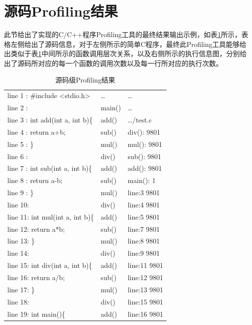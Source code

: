 \section{源码Profiling结果}
此节给出了实现的C/C++程序Profiling工具的最终结果输出示例，如表\ref{tab:13}所示，表格左侧给出了源码信息，对于左侧所示的简单C程序，最终此Profiling工具能够给出类似于表\ref{tab:13}中间所示的函数调用层次关系，以及右侧所示的执行信息图，分别给出了源码所对应的每一个函数的调用次数以及每一行所对应的执行次数。
\begin{table}[ht]
\centering
\caption{源码级Profiling结果}
\label{tab:13}
\begin{tabular}{|l|p{3cm}|l|}
\hline
line 1 : \#include <stdio.h>& \dots& \dots\\
line 2 : &\quad main()& \dots \\
line 3 : int add(int a, int b)\{& \quad \quad add()& \dots/test.c\\
line 4 : \quad return a+b;&\quad \quad sub()& \quad div():  9801\\
line 5 : \}& \quad \quad mul()& \quad mul():  9801\\
line 6 :& \quad \quad div()& \quad sub():  9801\\
line 7 : int sub(int a, int b)\{& \quad \quad add()& \quad add():  9801\\
line 8 : \quad return a-b;& \quad \quad sub()& \quad main():  1\\
line 9 : \}& \quad \quad mul()& \quad \quad line:3		9801\\
line 10:& \quad \quad div()& \quad \quad line:4		9801\\
line 11: int mul(int a, int b)\{& \quad \quad add()& \quad \quad line:5		9801\\
line 12: \quad return a*b;& \quad \quad sub()& \quad \quad line:7		9801\\
line 13: \}& \quad \quad mul()& \quad \quad	line:8		9801\\
line 14: & \quad \quad div()& \quad \quad line:9		9801\\
line 15: int div(int a, int b)\{& \quad \quad add()& \quad \quad line:11		9801\\
line 16: \quad return a/b;& \quad \quad sub()& \quad \quad line:12		9801\\
line 17: \}& \quad\quad mul()& \quad \quad line:13		9801\\
line 18: & \quad \quad div() & \quad \quad line:15		9801\\
line 19: int main()\{& \quad \quad add() & \quad \quad line:16		9801\\

\end{tabular}
\end{table}
